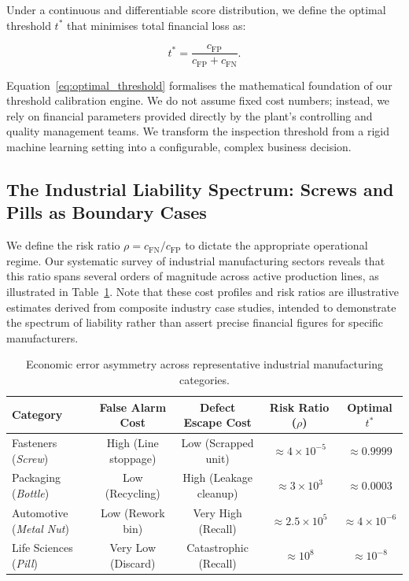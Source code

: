 Under a continuous and differentiable score distribution, we define the optimal threshold $t^*$ that minimises total financial loss as:

\begin{equation}
    t^* = \frac{c_{\mathrm{FP}}}{c_{\mathrm{FP}} + c_{\mathrm{FN}}}.
    \label{eq:optimal_threshold}
\end{equation}

Equation~\ref{eq:optimal_threshold} formalises the mathematical foundation of our threshold calibration engine. We do not assume fixed cost numbers; instead, we rely on financial parameters provided directly by the plant's controlling and quality management teams. We transform the inspection threshold from a rigid machine learning setting into a configurable, complex business decision.

\subsection{The Industrial Liability Spectrum: Screws and Pills as Boundary Cases}

We define the risk ratio $\rho = c_{\mathrm{FN}} / c_{\mathrm{FP}}$ to dictate the appropriate operational regime. Our systematic survey of industrial manufacturing sectors reveals that this ratio spans several orders of magnitude across active production lines, as illustrated in Table~\ref{tab:cost_asymmetry}. Note that these cost profiles and risk ratios are illustrative estimates derived from composite industry case studies, intended to demonstrate the spectrum of liability rather than assert precise financial figures for specific manufacturers.

\begin{table}[b!]
\centering
\caption{Economic error asymmetry across representative industrial manufacturing categories.}
\label{tab:cost_asymmetry}
\scriptsize
\begin{tabular}{@{}p{3.2cm}cccc@{}}
\toprule
\textbf{Category} & \textbf{False Alarm Cost} & \textbf{Defect Escape Cost} & \textbf{Risk Ratio ($\rho$)} & \textbf{Optimal $t^*$} \\
\midrule
Fasteners (\emph{Screw})     & High (Line stoppage)  & Low (Scrapped unit) & $\approx 4 \times 10^{-5}$ & $\approx 0.9999$ \\
Packaging (\emph{Bottle})    & Low (Recycling)     & High (Leakage cleanup)& $\approx 3 \times 10^{3}$  & $\approx 0.0003$ \\
Automotive (\emph{Metal Nut})& Low (Rework bin)    & Very High (Recall) & $\approx 2.5 \times 10^{5}$ & $\approx 4 \times 10^{-6}$ \\
Life Sciences (\emph{Pill})  & Very Low (Discard)  & Catastrophic (Recall) & $\approx 10^{8}$ & $\approx 10^{-8}$ \\
\bottomrule
\end{tabular}
\end{table}

